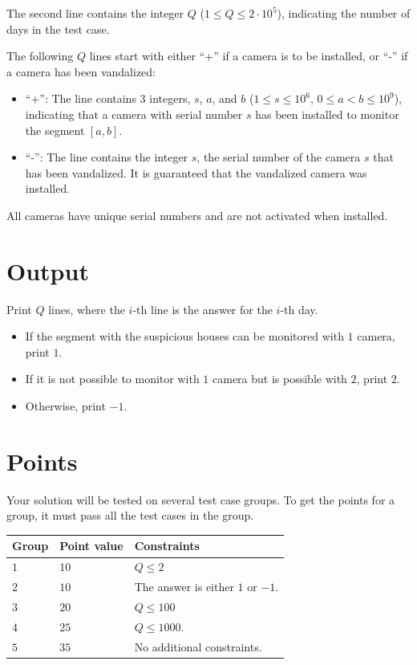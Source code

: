 The second line contains the integer $Q$ ($1 \le Q \le 2 \cdot 10^5$), 
indicating the number of days in the test case.

The following $Q$ lines start with either ``+'' if a camera is to be installed, or ``-'' if a camera has been vandalized:
\begin{itemize}
  \item ``+'': The line contains $3$ integers, $s$, $a$, and $b$ ($1\le s \le 10^6$, $0\le a < b \le 10^9$), 
  indicating that a camera with serial number $s$ has been installed to monitor the segment $[a,b]$.
  \item ``-'': The line contains the integer $s$, the serial number of the camera $s$ that has been vandalized.
  It is guaranteed that the vandalized camera was installed.
\end{itemize}

All cameras have unique serial numbers and are not activated when installed.

\section*{Output}
Print $Q$ lines, where the $i$-th line is the answer for the $i$-th day.
\begin{itemize}
  \item If the segment with the suspicious houses can be monitored with $1$ camera, print $1$.
  \item If it is not possible to monitor with $1$ camera but is possible with $2$, print $2$.
  \item Otherwise, print $-1$.
\end{itemize}


\section*{Points}
Your solution will be tested on several test case groups.
To get the points for a group, it must pass all the test cases in the group.

\noindent
\begin{tabular}{| l | l | p{12cm} |}
  \hline
  \textbf{Group} & \textbf{Point value} & \textbf{Constraints} \\ \hline
  $1$    & $10$       & $Q \le 2$ \\ \hline
  $2$    & $10$       & The answer is either $1$ or $-1$. \\ \hline
  $3$    & $20$       & $Q \le 100$ \\ \hline
  $4$    & $25$       & $Q \le 1000$. \\ \hline
  $5$    & $35$       & No additional constraints. \\ \hline
\end{tabular}

